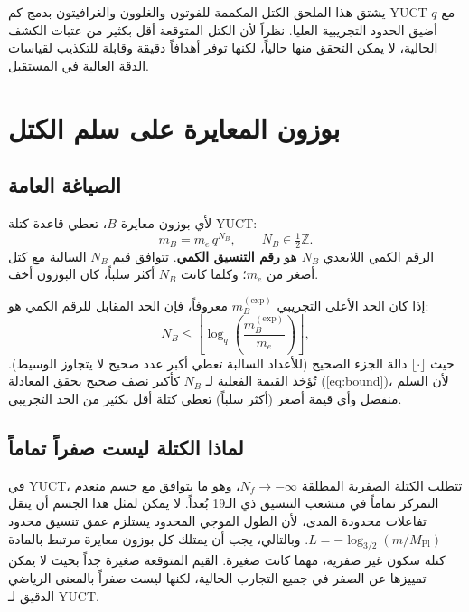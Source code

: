 \documentclass[12pt,a4paper]{article}
\newcommand{\Mpl}{M_{\mathrm{Pl}}}
\begin{document}
	يشتق هذا الملحق الكتل المكممة للفوتون والغلوون والغرافيتون بدمج كم YUCT $q$ مع أضيق الحدود التجريبية العليا.
	نظراً لأن الكتل المتوقعة أقل بكثير من عتبات الكشف الحالية، لا يمكن التحقق منها حالياً، لكنها توفر أهدافاً دقيقة وقابلة للتكذيب
	لقياسات الدقة العالية في المستقبل.
	
	\section{بوزون المعايرة على سلم الكتل}
	
	\subsection{الصياغة العامة}
	
	لأي بوزون معايرة $B$، تعطي قاعدة كتلة YUCT:
	\begin{equation}\label{eq:bosonmass}
		m_B = m_e \, q^{N_B}, \qquad N_B \in \tfrac12\mathbb{Z}.
	\end{equation}
	الرقم الكمي اللابعدي $N_B$ هو \textbf{رقم التنسيق الكمي}. تتوافق قيم $N_B$ السالبة مع كتل أصغر من $m_e$؛ وكلما كانت $N_B$ أكثر سلباً، كان البوزون أخف.
	
	إذا كان الحد الأعلى التجريبي $m_B^{\mathrm{(exp)}}$ معروفاً، فإن الحد المقابل للرقم الكمي هو:
	\begin{equation}\label{eq:bound}
		N_B \le \left\lfloor \log_q\!\left( \frac{m_B^{\mathrm{(exp)}}}{m_e} \right) \right\rfloor ,
	\end{equation}
	حيث $\lfloor\cdot\rfloor$ دالة الجزء الصحيح (للأعداد السالبة تعطي أكبر عدد صحيح لا يتجاوز الوسيط). تُؤخذ القيمة الفعلية لـ $N_B$ كأكبر نصف صحيح يحقق المعادلة (\ref{eq:bound})، لأن السلم منفصل وأي قيمة أصغر (أكثر سلباً) تعطي كتلة أقل بكثير من الحد التجريبي.
	
	\subsection{لماذا الكتلة ليست صفراً تماماً}
	
	في YUCT، تتطلب الكتلة الصفرية المطلقة $N_f \to -\infty$، وهو ما يتوافق مع جسم منعدم التمركز تماماً في متشعب التنسيق ذي الـ19 بُعداً. لا يمكن لمثل هذا الجسم أن ينقل تفاعلات محدودة المدى، لأن الطول الموجي المحدود يستلزم عمق تنسيق محدود $L = -\log_{3/2}(m/\Mpl)$. وبالتالي، يجب أن يمتلك كل بوزون معايرة مرتبط بالمادة كتلة سكون غير صفرية، مهما كانت صغيرة. القيم المتوقعة صغيرة جداً بحيث لا يمكن تمييزها عن الصفر في جميع التجارب الحالية، لكنها ليست صفراً بالمعنى الرياضي الدقيق لـ YUCT.
	
\end{document}
